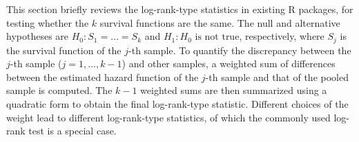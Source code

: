 This section briefly reviews the log-rank-type statistics in existing R packages, for testing whether the $k$ survival functions are the same. The null and alternative hypotheses are $H_0 \colon S_1=\ldots=S_k$ and $H_1 \colon H_0 \mbox{ is not true}$, respectively, where $S_j$ is the survival function of the $j$-th sample.
To quantify the discrepancy between
the $j$-th sample ($j=1, \ldots, k-1$) and other samples, a weighted sum of differences  between the estimated hazard function of the $j$-th sample and that of the pooled sample is computed.
The $k-1$ weighted sums are then summarized using a quadratic form to obtain the final log-rank-type statistic.
Different choices of the weight lead to different log-rank-type statistics, of which the commonly used log-rank test is a special case.

